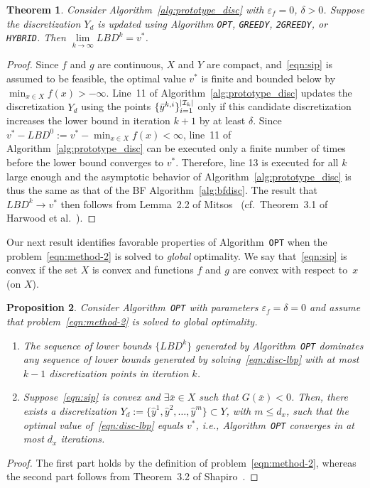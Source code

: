\documentclass{article}
\newcommand{\uset}[2]{\ensuremath{\underset{#1}{#2}}}
\DeclarePairedDelimiter\abs{\lvert}{\rvert}%
\newcommand{\1}[1]{\mathds{1}\left[#1\right]}
\newtheorem{theorem}{Theorem}[]
\newtheorem{proposition}[theorem]{Proposition}
\begin{document}
\begin{theorem}
\label{thm:conv_lbd_disc}
Consider Algorithm~\ref{alg:prototype_disc} with $\varepsilon_f = 0$, $\delta > 0$. Suppose the discretization $Y_d$ is updated using Algorithm \texttt{OPT}, \texttt{GREEDY}, \texttt{2GREEDY}, or \texttt{HYBRID}.
Then $\uset{k \to \infty}{\lim} LBD^k = v^*$.
\end{theorem}
\begin{proof}
Since $f$ and $g$ are continuous, $X$ and $Y$ are compact, and~\eqref{eqn:sip} is assumed to be feasible, the optimal value $v^*$ is finite and bounded below by $\min_{x \in X} f(x) > -\infty$.
Line~11 of Algorithm~\ref{alg:prototype_disc} updates the discretization $Y_d$ using the points $\{\bar{y}^{k,i}\}_{i=1}^{\abs{\mathcal{I}_k}}$ only if this candidate discretization increases the lower bound in iteration $k+1$ by at least $\delta$. 
Since $v^* - LBD^0 := v^* - \min_{x \in X} f(x) < \infty$, line~11 of Algorithm~\ref{alg:prototype_disc} can be executed only a finite number of times before the lower bound converges to $v^*$.
Therefore, line 13 is executed for all $k$ large enough and the asymptotic behavior of Algorithm~\ref{alg:prototype_disc} is thus the same as that of the BF Algorithm~\ref{alg:bfdisc}.
The result that $LBD^k \rightarrow v^*$ then follows from Lemma~2.2 of Mitsos~\cite{mitsos2011global} (cf.\ Theorem~3.1 of Harwood et al.\ \cite{harwood2021note}).
\end{proof}




Our next result identifies favorable properties of Algorithm~\texttt{OPT} when the problem~\eqref{eqn:method-2} is solved to \textit{global} optimality.
We say that~\eqref{eqn:sip} is convex if the set $X$ is convex and functions $f$ and $g$ are convex with respect to~$x$ (on $X$).


\begin{proposition}
\label{prop:alg_opt}
Consider Algorithm~\texttt{OPT} with parameters $\varepsilon_f = \delta = 0$ and assume that problem~\eqref{eqn:method-2} is solved to \textit{global} optimality.
\begin{enumerate}
\item The sequence of lower bounds $\{LBD^k\}$ generated by Algorithm~\texttt{OPT} dominates any sequence of lower bounds generated by solving~\eqref{eqn:disc-lbp} with at most $k-1$ discretization points in iteration $k$.

\item Suppose~\eqref{eqn:sip} is convex and $\exists \bar{x} \in X$ such that $G(\bar{x}) < 0$. Then, there exists a discretization $Y_d := \{\hat{y}^1,\hat{y}^2,\dots,\hat{y}^m\} \subset Y$, with $m \leq d_x$, such that the optimal value of~\eqref{eqn:disc-lbp} equals $v^*$, i.e., Algorithm~\texttt{OPT} converges in at most $d_x$ iterations.
\end{enumerate}
\end{proposition}
\begin{proof}
The first part holds by the definition of problem~\eqref{eqn:method-2}, whereas the second part follows from Theorem~3.2 of Shapiro~\cite{shapiro2009semi}.
\end{proof}
\end{document}
